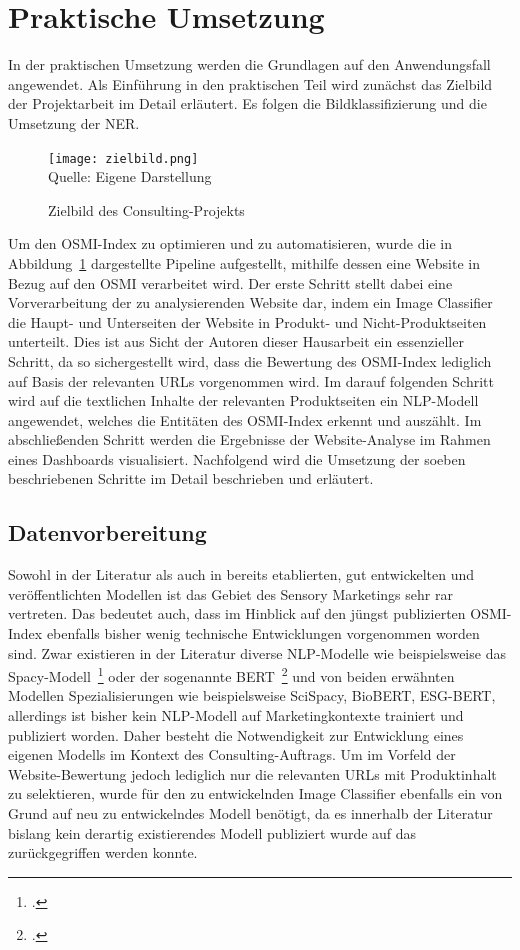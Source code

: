 \newpage
\section{Praktische Umsetzung}\label{sec_praktische_umsetzung}

In der praktischen Umsetzung werden die Grundlagen auf den Anwendungsfall angewendet.
Als Einführung in den praktischen Teil wird zunächst das Zielbild der Projektarbeit im Detail erläutert.
Es folgen die Bildklassifizierung und die Umsetzung der \acf{NER}.

\begin{figure}[H]
	\caption{Zielbild des Consulting-Projekts}\label{fig:zielbild}
	\texttt{[image: zielbild.png]}
	\\
	Quelle: Eigene Darstellung
\end{figure}

Um den OSMI-Index zu optimieren und zu automatisieren, wurde die in Abbildung~\ref{fig:zielbild} dargestellte Pipeline aufgestellt, mithilfe dessen
eine Website in Bezug auf den OSMI verarbeitet wird.
Der erste Schritt stellt dabei eine Vorverarbeitung der zu analysierenden Website dar, indem ein Image Classifier die Haupt- und Unterseiten der Website in
Produkt- und Nicht-Produktseiten unterteilt.
Dies ist aus Sicht der Autoren dieser Hausarbeit ein essenzieller Schritt, da so sichergestellt wird, dass die Bewertung des OSMI-Index lediglich auf Basis
der relevanten URLs vorgenommen wird.
Im darauf folgenden Schritt wird auf die textlichen Inhalte der relevanten Produktseiten ein \ac{NLP}-Modell angewendet, welches die Entitäten des OSMI-Index erkennt und auszählt.
Im abschließenden Schritt werden die Ergebnisse der Website-Analyse im Rahmen eines Dashboards visualisiert.
Nachfolgend wird die Umsetzung der soeben beschriebenen Schritte im Detail beschrieben und erläutert.

\subsection{Datenvorbereitung}

Sowohl in der Literatur als auch in bereits etablierten, gut entwickelten und veröffentlichten Modellen ist das Gebiet
des Sensory Marketings sehr rar vertreten.
Das bedeutet auch, dass im Hinblick auf den jüngst publizierten \ac{OSMI}-Index ebenfalls bisher wenig technische Entwicklungen
vorgenommen worden sind.
Zwar existieren in der Literatur diverse NLP-Modelle wie beispielsweise das Spacy-Modell~\footcite[\vglf][]{spacy2017} oder der sogenannte BERT~\footcite[\vglf][]{devlin2018}
und von beiden erwähnten Modellen Spezialisierungen wie beispielsweise SciSpacy, BioBERT, ESG-BERT, allerdings ist
bisher kein \ac{NLP}-Modell auf Marketingkontexte trainiert und publiziert worden. Daher besteht die Notwendigkeit zur Entwicklung eines
eigenen Modells im Kontext des Consulting-Auftrags.
Um im Vorfeld der Website-Bewertung jedoch lediglich nur die relevanten URLs mit Produktinhalt zu selektieren, wurde für den zu
entwickelnden Image Classifier ebenfalls ein von Grund auf neu zu entwickelndes Modell benötigt, da es innerhalb der Literatur
bislang kein derartig existierendes Modell publiziert wurde auf das zurückgegriffen werden konnte.

